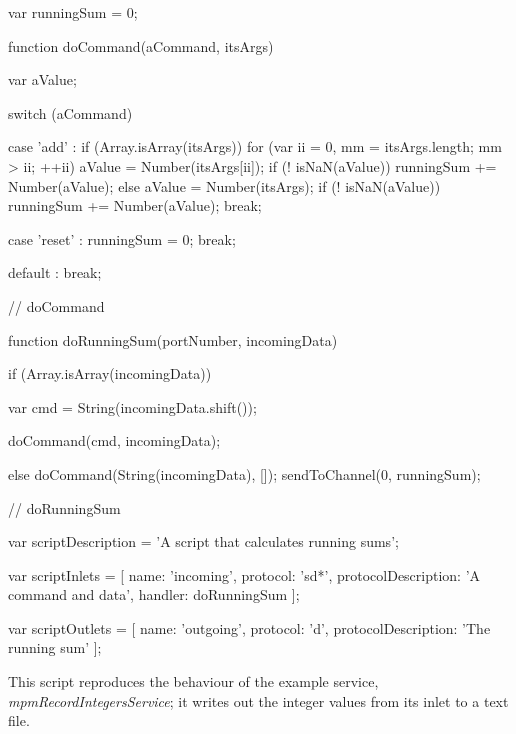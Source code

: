 \codeBegin{}
\begin{listing}[5]{1}
var runningSum = 0;

function doCommand(aCommand, itsArgs)
{
    var aValue;
    
    switch (aCommand)
    {
        case 'add' :
            if (Array.isArray(itsArgs))
            {
                for (var ii = 0, mm = itsArgs.length; mm > ii; ++ii)
                {
                    aValue = Number(itsArgs[ii]);
                    if (! isNaN(aValue))
                    {
                        runningSum += Number(aValue);
                    }
                }
            }
            else
            {
                aValue = Number(itsArgs);
                if (! isNaN(aValue))
                {
                    runningSum += Number(aValue);
                }
            }
            break;
            
        case 'reset' :
            runningSum = 0;
            break;
            
        default :
            break;
            
    }
} // doCommand

function doRunningSum(portNumber, incomingData)
{
    if (Array.isArray(incomingData))
    {
        var cmd = String(incomingData.shift());
        
        doCommand(cmd, incomingData);
    }
    else
    {
        doCommand(String(incomingData), []);
    }
    sendToChannel(0, runningSum);
} // doRunningSum

var scriptDescription = 'A script that calculates running sums';

var scriptInlets = [ { name: 'incoming', protocol: 'sd*',
                        protocolDescription: 'A command and data',
                        handler: doRunningSum } ];

var scriptOutlets = [ { name: 'outgoing', protocol: 'd',
                        protocolDescription: 'The running sum' } ];
\end{listing}
\codeEnd{}
\secondaryEnd{}
\condPage{}
This script reproduces the behaviour of the example service,
\emph{mpmRecordIntegersService}; it writes out the integer values from its inlet to a text
file.\\

